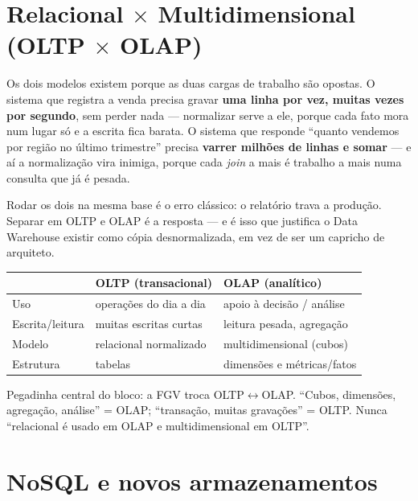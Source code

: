 \section{Relacional $\times$ Multidimensional (OLTP $\times$ OLAP)}

Os dois modelos existem porque as duas cargas de trabalho são opostas. O
sistema que registra a venda precisa gravar \textbf{uma linha por vez, muitas
vezes por segundo}, sem perder nada --- normalizar serve a ele, porque cada
fato mora num lugar só e a escrita fica barata. O sistema que responde
``quanto vendemos por região no último trimestre'' precisa \textbf{varrer
milhões de linhas e somar} --- e aí a normalização vira inimiga, porque cada
\emph{join} a mais é trabalho a mais numa consulta que já é pesada.

Rodar os dois na mesma base é o erro clássico: o relatório trava a produção.
Separar em OLTP e OLAP é a resposta --- e é isso que justifica o Data
Warehouse existir como cópia desnormalizada, em vez de ser um capricho de
arquiteto.

\begin{center}
\begin{tabular}{@{}p{2.6cm}p{4.4cm}p{4.4cm}@{}}
\toprule
& \textbf{OLTP (transacional)} & \textbf{OLAP (analítico)} \\
\midrule
Uso & operações do dia a dia & apoio à decisão / análise \\
Escrita/leitura & muitas escritas curtas & leitura pesada, agregação \\
Modelo & relacional normalizado & multidimensional (cubos) \\
Estrutura & tabelas & dimensões e métricas/fatos \\
\bottomrule
\end{tabular}
\end{center}

\begin{pegadinha}
Pegadinha central do bloco: a FGV troca OLTP$\leftrightarrow$OLAP. ``Cubos,
dimensões, agregação, análise'' = OLAP; ``transação, muitas gravações'' =
OLTP. Nunca ``relacional é usado em OLAP e multidimensional em OLTP''.
\end{pegadinha}

\section{NoSQL e novos armazenamentos}

